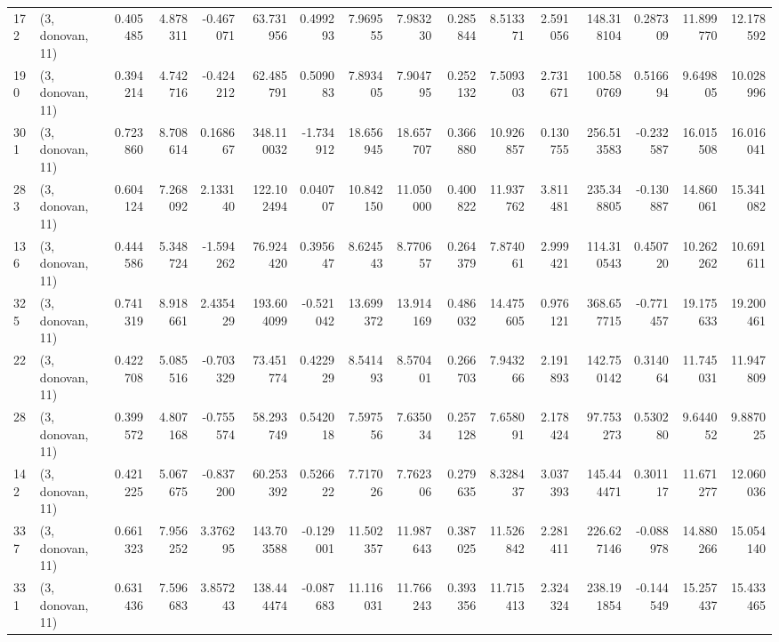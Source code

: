 \begin{tabular}{llrrrrrrrrrrrrrr}
172 &  (3, donovan, 11) &   0.405485 &   4.878311 &  -0.467071 &    63.731956 &   0.499293 &   7.969555 &   7.983230 &  0.285844 &   8.513371 &   2.591056 &    148.318104 &    0.287309 &   11.899770 &   12.178592 \\
190 &  (3, donovan, 11) &   0.394214 &   4.742716 &  -0.424212 &    62.485791 &   0.509083 &   7.893405 &   7.904795 &  0.252132 &   7.509303 &   2.731671 &    100.580769 &    0.516694 &    9.649805 &   10.028996 \\
301 &  (3, donovan, 11) &   0.723860 &   8.708614 &   0.168667 &   348.110032 &  -1.734912 &  18.656945 &  18.657707 &  0.366880 &  10.926857 &   0.130755 &    256.513583 &   -0.232587 &   16.015508 &   16.016041 \\
283 &  (3, donovan, 11) &   0.604124 &   7.268092 &   2.133140 &   122.102494 &   0.040707 &  10.842150 &  11.050000 &  0.400822 &  11.937762 &   3.811481 &    235.348805 &   -0.130887 &   14.860061 &   15.341082 \\
136 &  (3, donovan, 11) &   0.444586 &   5.348724 &  -1.594262 &    76.924420 &   0.395647 &   8.624543 &   8.770657 &  0.264379 &   7.874061 &   2.999421 &    114.310543 &    0.450720 &   10.262262 &   10.691611 \\
325 &  (3, donovan, 11) &   0.741319 &   8.918661 &   2.435429 &   193.604099 &  -0.521042 &  13.699372 &  13.914169 &  0.486032 &  14.475605 &   0.976121 &    368.657715 &   -0.771457 &   19.175633 &   19.200461 \\
22  &  (3, donovan, 11) &   0.422708 &   5.085516 &  -0.703329 &    73.451774 &   0.422929 &   8.541493 &   8.570401 &  0.266703 &   7.943266 &   2.191893 &    142.750142 &    0.314064 &   11.745031 &   11.947809 \\
28  &  (3, donovan, 11) &   0.399572 &   4.807168 &  -0.755574 &    58.293749 &   0.542018 &   7.597556 &   7.635034 &  0.257128 &   7.658091 &   2.178424 &     97.753273 &    0.530280 &    9.644052 &    9.887025 \\
142 &  (3, donovan, 11) &   0.421225 &   5.067675 &  -0.837200 &    60.253392 &   0.526622 &   7.717026 &   7.762306 &  0.279635 &   8.328437 &   3.037393 &    145.444471 &    0.301117 &   11.671277 &   12.060036 \\
337 &  (3, donovan, 11) &   0.661323 &   7.956252 &   3.376295 &   143.703588 &  -0.129001 &  11.502357 &  11.987643 &  0.387025 &  11.526842 &   2.281411 &    226.627146 &   -0.088978 &   14.880266 &   15.054140 \\
331 &  (3, donovan, 11) &   0.631436 &   7.596683 &   3.857243 &   138.444474 &  -0.087683 &  11.116031 &  11.766243 &  0.393356 &  11.715413 &   2.324324 &    238.191854 &   -0.144549 &   15.257437 &   15.433465 \\

\end{tabular}
